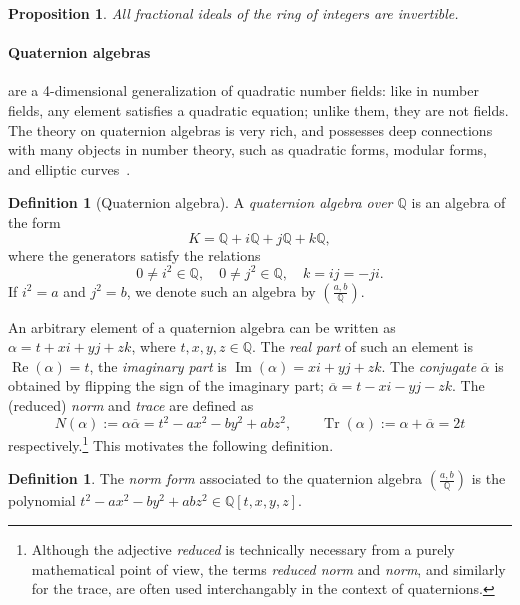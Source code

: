 \documentclass[10pt]{article}
\theoremstyle{plain}
\newtheorem{proposition}[theorem]{Proposition}
\theoremstyle{definition}
\newtheorem{definition}[theorem]{Definition}
\DeclareMathOperator{\Tr}{Tr} %
\DeclareMathOperator{\im}{Im} %
\DeclareMathOperator{\re}{Re} %
\def\Q{\ensuremath{\mathbb{Q}}}
\begin{document}
\begin{proposition}
  All fractional ideals of the ring of integers are invertible.
\end{proposition}



\paragraph{Quaternion algebras} %
are a 4-dimensional generalization of quadratic number fields: like in
number fields, any element satisfies a quadratic equation; unlike
them, they are not fields. The theory on quaternion algebras is very rich,
and possesses deep connections with many objects in number theory, such as
quadratic forms, modular forms, and elliptic curves~\cite{Lam,Voight2018}.

\begin{definition}[Quaternion algebra]
  A \emph{quaternion algebra over $\Q$} is an algebra of the form
  \[K = ℚ + iℚ + jℚ + kℚ,\]
  where the generators satisfy the relations
  \[0\neq i^2\in\Q, \quad 0\neq j^2∈ℚ, \quad k=ij=-ji.\]
  If $i^2 = a$ and $j^2 = b$, we denote such an algebra by
  $\left(\frac{a,b}{\Q}\right)$.
\end{definition}

An arbitrary element of a quaternion algebra can be written as
$\alpha = t + xi  + yj + zk$, where $t,x,y,z\in\Q$.
The \emph{real part}  of such an element is $\re(\alpha) = t$,
the \emph{imaginary part} is $\im(\alpha) = xi + yj + zk$.
The \emph{conjugate} $\overline{\alpha}$ is obtained
by flipping the sign of the imaginary part;
$\overline{\alpha} = t - xi - yj - zk$.
The (reduced) \emph{norm} and \emph{trace} are defined as
\begin{equation*}
N(\alpha) := \alpha\overline{\alpha} = t^2 - ax^2 - by^2 +abz^2, \qquad
\Tr(\alpha) := \alpha + \overline{\alpha} = 2t
\end{equation*}
respectively.\footnote{Although the adjective \emph{reduced} is technically
necessary from a purely mathematical point of view, the terms
\emph{reduced norm} and \emph{norm}, and similarly for the trace,
are often used interchangably in the context of quaternions.}
This motivates the following definition.

\begin{definition}
The \emph{norm form} associated to the quaternion algebra $\left(\frac{a,b}{\Q}\right)$ is the polynomial $t^2 - ax^2 - by^2 + abz^2\in\Q[t,x,y,z]$. 
\end{definition}
\end{document}

